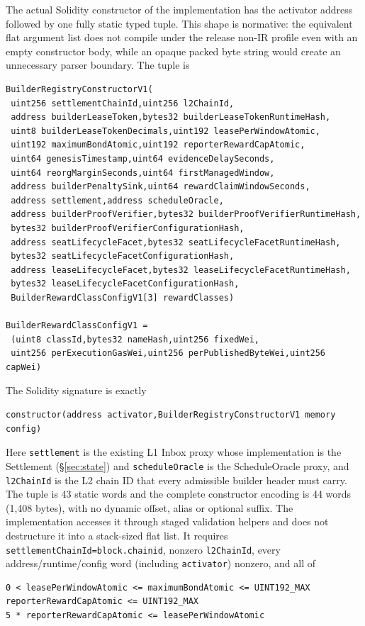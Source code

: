 \documentclass[a4paper,11pt]{article}
\newcommand{\code}[1]{\nolinkurl{#1}}
\begin{document}
The actual Solidity constructor of the implementation has the activator
address followed by one fully static typed tuple.  This shape is normative:
the equivalent flat argument list does not compile under the release non-IR
profile even with an empty constructor body, while an opaque packed byte
string would create an unnecessary parser boundary.  The tuple is
\begin{verbatim}
BuilderRegistryConstructorV1(
 uint256 settlementChainId,uint256 l2ChainId,
 address builderLeaseToken,bytes32 builderLeaseTokenRuntimeHash,
 uint8 builderLeaseTokenDecimals,uint192 leasePerWindowAtomic,
 uint192 maximumBondAtomic,uint192 reporterRewardCapAtomic,
 uint64 genesisTimestamp,uint64 evidenceDelaySeconds,
 uint64 reorgMarginSeconds,uint64 firstManagedWindow,
 address builderPenaltySink,uint64 rewardClaimWindowSeconds,
 address settlement,address scheduleOracle,
 address builderProofVerifier,bytes32 builderProofVerifierRuntimeHash,
 bytes32 builderProofVerifierConfigurationHash,
 address seatLifecycleFacet,bytes32 seatLifecycleFacetRuntimeHash,
 bytes32 seatLifecycleFacetConfigurationHash,
 address leaseLifecycleFacet,bytes32 leaseLifecycleFacetRuntimeHash,
 bytes32 leaseLifecycleFacetConfigurationHash,
 BuilderRewardClassConfigV1[3] rewardClasses)

BuilderRewardClassConfigV1 =
 (uint8 classId,bytes32 nameHash,uint256 fixedWei,
 uint256 perExecutionGasWei,uint256 perPublishedByteWei,uint256 capWei)
\end{verbatim}
The Solidity signature is exactly
\begin{verbatim}
constructor(address activator,BuilderRegistryConstructorV1 memory config)
\end{verbatim}
Here \code{settlement} is the existing L1 Inbox proxy whose implementation is
the Settlement (\S\ref{sec:state}) and \code{scheduleOracle} is the
ScheduleOracle proxy, and \code{l2ChainId} is the L2 chain ID that every
admissible builder header must carry.  The tuple is 43 static words and the
complete constructor encoding is 44 words (1,408 bytes), with no dynamic
offset, alias or optional suffix.  The implementation accesses it through staged validation
helpers and does not destructure it into a stack-sized flat list.
It requires \code{settlementChainId=block.chainid}, nonzero \code{l2ChainId},
every address/runtime/config word (including \code{activator}) nonzero, and all of
\begin{verbatim}
0 < leasePerWindowAtomic <= maximumBondAtomic <= UINT192_MAX
reporterRewardCapAtomic <= UINT192_MAX
5 * reporterRewardCapAtomic <= leasePerWindowAtomic
\end{verbatim}
\end{document}
